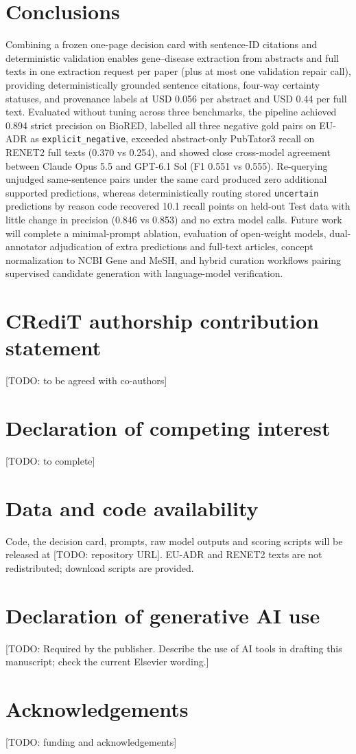 \documentclass[preprint,10pt,letterpaper]{elsarticle}
\newcommand{\st}[1]{\texttt{#1}}             %
\newcommand{\todo}[1]{\textcolor{stneg}{[TODO: #1]}}
\begin{document}
\section{Conclusions}
Combining a frozen one-page decision card with sentence-ID citations and deterministic validation enables gene--disease extraction from abstracts and full texts in one extraction request per paper (plus at most one validation repair call), providing deterministically grounded sentence citations, four-way certainty statuses, and provenance labels at USD 0.056 per abstract and USD 0.44 per full text. Evaluated without tuning across three benchmarks, the pipeline achieved 0.894 strict precision on BioRED, labelled all three negative gold pairs on EU-ADR as \st{explicit\_negative}, exceeded abstract-only PubTator3 recall on RENET2 full texts (0.370 vs 0.254), and showed close cross-model agreement between Claude Opus 5.5 and GPT-6.1 Sol (F1 0.551 vs 0.555). Re-querying unjudged same-sentence pairs under the same card produced zero additional supported predictions, whereas deterministically routing stored \st{uncertain} predictions by reason code recovered 10.1 recall points on held-out Test data with little change in precision (0.846 vs 0.853) and no extra model calls. Future work will complete a minimal-prompt ablation, evaluation of open-weight models, dual-annotator adjudication of extra predictions and full-text articles, concept normalization to NCBI Gene and MeSH, and hybrid curation workflows pairing supervised candidate generation with language-model verification.

\section*{CRediT authorship contribution statement}
\todo{to be agreed with co-authors}

\section*{Declaration of competing interest}
\todo{to complete}

\section*{Data and code availability}
Code, the decision card, prompts, raw model outputs and scoring scripts will be released at \todo{repository URL}. EU-ADR and RENET2 texts are not redistributed; download scripts are provided.

\section*{Declaration of generative AI use}
\todo{Required by the publisher. Describe the use of AI tools in drafting this manuscript; check the current Elsevier wording.}

\section*{Acknowledgements}
\todo{funding and acknowledgements}



\end{document}
